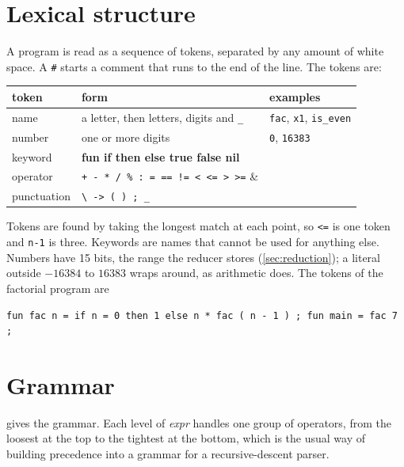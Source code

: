 \documentclass[11pt,a4paper]{article}
\theoremstyle{definition}
\theoremstyle{plain}
\newcommand{\kw}[1]{\textbf{#1}}
\newcommand{\nt}[1]{\textit{#1}}
\begin{document}
\section{Lexical structure}\label{sec:lexical}

A program is read as a sequence of tokens, separated by any amount of white
space. A \verb|#| starts a comment that runs to the end of the line. The
tokens are:

\begin{center}
\small
\begin{tabular}{@{}l l l@{}}
\toprule
token & form & examples\\
\midrule
name & a letter, then letters, digits and \verb|_| & \texttt{fac}, \texttt{x1}, \texttt{is\_even}\\
number & one or more digits & \texttt{0}, \texttt{16383}\\
keyword & \kw{fun if then else true false nil} & \\
operator & \verb|+ - * / % : = == != < <= > >=| & \\
punctuation & \verb|\ -> ( ) ; _| & \\
\bottomrule
\end{tabular}
\end{center}

\noindent
Tokens are found by taking the longest match at each point, so \verb|<=| is
one token and \verb|n-1| is three. Keywords are names that cannot be used for
anything else. Numbers have 15 bits, the range the reducer stores
(\cref{sec:reduction}); a literal outside $-16384$ to $16383$ wraps around,
as arithmetic does. The tokens of the factorial program are
\begin{lstlisting}[style=plain]
fun fac n = if n = 0 then 1 else n * fac ( n - 1 ) ; fun main = fac 7 ;
\end{lstlisting}

\section{Grammar}\label{sec:grammar}

 gives the grammar. Each level of \nt{expr} handles one
group of operators, from the loosest at the top to the tightest at the
bottom, which is the usual way of building precedence into a grammar for a
recursive-descent parser.
\end{document}
